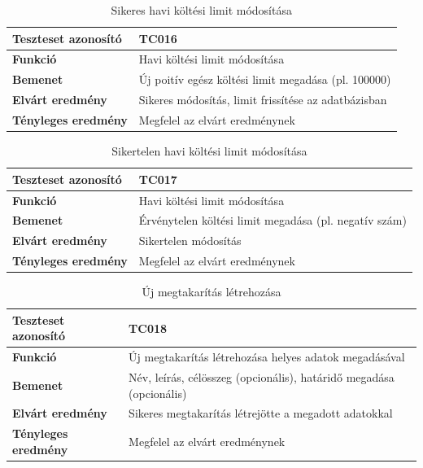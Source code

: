 \begin{table}[h!]
	\centering
	\begin{tabular}{|l|p{10cm}|}
		\hline
		\textbf{Teszteset azonosító} & TC016 \\ \hline
		\textbf{Funkció} & Havi költési limit módosítása \\ \hline
		\textbf{Bemenet} & Új poitív egész költési limit megadása (pl. 100000) \\ \hline
		\textbf{Elvárt eredmény} & Sikeres módosítás, limit frissítése az adatbázisban \\ \hline
		\textbf{Tényleges eredmény} & Megfelel az elvárt eredménynek \\ \hline
	\end{tabular}
	\caption{Sikeres havi költési limit módosítása}
	\label{tab:havi_limit_modositas}
\end{table}
\begin{table}[h!]
	\centering
	\begin{tabular}{|l|p{10cm}|}
		\hline
		\textbf{Teszteset azonosító} & TC017 \\ \hline
		\textbf{Funkció} & Havi költési limit módosítása \\ \hline
		\textbf{Bemenet} & Érvénytelen költési limit megadása (pl. negatív szám)\\ \hline
		\textbf{Elvárt eredmény} & Sikertelen módosítás \\ \hline
		\textbf{Tényleges eredmény} & Megfelel az elvárt eredménynek \\ \hline
	\end{tabular}
	\caption{Sikertelen havi költési limit módosítása}
	\label{tab:havi_limit_modositas_sikertelen}
\end{table}

\begin{table}[h!]
	\centering
	\begin{tabular}{|l|p{10cm}|}
		\hline
		\textbf{Teszteset azonosító} & TC018 \\ \hline
		\textbf{Funkció} & Új megtakarítás létrehozása helyes adatok megadásával \\ \hline
		\textbf{Bemenet} & Név, leírás, célösszeg (opcionális), határidő megadása (opcionális) \\ \hline
		\textbf{Elvárt eredmény} & Sikeres megtakarítás létrejötte a megadott adatokkal \\ \hline
		\textbf{Tényleges eredmény} & Megfelel az elvárt eredménynek \\ \hline
	\end{tabular}
	\caption{Új megtakarítás létrehozása}
	\label{tab:megtakaritas}
\end{table}

